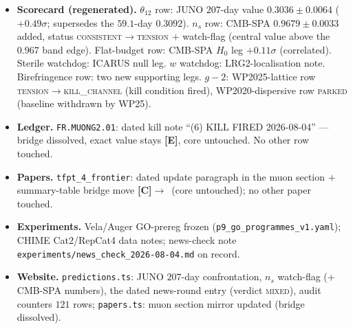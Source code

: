 \documentclass[11pt]{article}
\providecommand{\mE}{\textbf{[E]}}\providecommand{\mC}{\textbf{[C]}}
\begin{document}
\begin{itemize}[leftmargin=1.5em]
  \item \textbf{Scorecard (regenerated).} $\theta_{12}$ row: JUNO $207$-day value $0.3036\pm0.0064$ ($+0.49\sigma$; supersedes the $59.1$-day $0.3092$).  $n_s$ row: CMB-SPA $0.9679\pm0.0033$ added, status \textsc{consistent}$\to$\textsc{tension} $+$ watch-flag (central value above the $0.967$ band edge).  Flat-budget row: CMB-SPA $H_0$ leg $+0.11\sigma$ (correlated).  Sterile watchdog: ICARUS null leg.  $w$ watchdog: LRG2-localisation note.  Birefringence row: two new supporting legs.  $g{-}2$: WP2025-lattice row \textsc{tension}$\to$\textsc{kill\_channel} (kill condition fired), WP2020-dispersive row \textsc{parked} (baseline withdrawn by WP25).
  \item \textbf{Ledger.} \texttt{FR.MUONG2.01}: dated kill note ``(6) KILL FIRED 2026-08-04'' --- bridge dissolved, exact value stays \mE, core untouched.  No other row touched.
  \item \textbf{Papers.} \texttt{tfpt\_4\_frontier}: dated update paragraph in the muon section $+$ summary-table bridge move \mC$\to$\mX\ (core untouched); no other paper touched.
  \item \textbf{Experiments.} Vela/Auger GO-prereg frozen (\texttt{p9\_go\_programmes\_v1.yaml}); CHIME Cat2/RepCat4 data notes; news-check note \texttt{experiments/news\_check\_2026-08-04.md} on record.
  \item \textbf{Website.} \texttt{predictions.ts}: JUNO $207$-day confrontation, $n_s$ watch-flag ($+$ CMB-SPA numbers), the dated news-round entry (verdict \textsc{mixed}), audit counters $121$ rows; \texttt{papers.ts}: muon section mirror updated (bridge dissolved).
\end{itemize}
\end{document}

